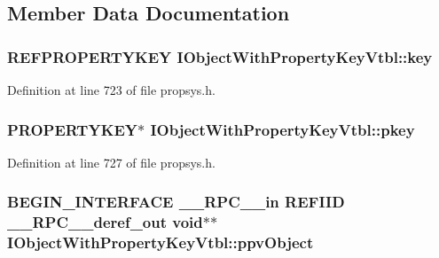 \subsection{Member Data Documentation}
\subsubsection[{\texorpdfstring{key}{key}}]{ {\bf R\+E\+F\+P\+R\+O\+P\+E\+R\+T\+Y\+K\+EY} I\+Object\+With\+Property\+Key\+Vtbl\+::key}\hypertarget{struct_i_object_with_property_key_vtbl_aea07e93e4789c7331bf474f6c5b452cf}{}\label{struct_i_object_with_property_key_vtbl_aea07e93e4789c7331bf474f6c5b452cf}


Definition at line 723 of file propsys.\+h.

\subsubsection[{\texorpdfstring{pkey}{pkey}}]{ {\bf P\+R\+O\+P\+E\+R\+T\+Y\+K\+EY}$\ast$ I\+Object\+With\+Property\+Key\+Vtbl\+::pkey}\hypertarget{struct_i_object_with_property_key_vtbl_a5aeba8bce0c15611f74a0299fca060d4}{}\label{struct_i_object_with_property_key_vtbl_a5aeba8bce0c15611f74a0299fca060d4}


Definition at line 727 of file propsys.\+h.

\subsubsection[{\texorpdfstring{ppv\+Object}{ppvObject}}]{\setlength{\rightskip}{0pt plus 5cm}B\+E\+G\+I\+N\+\_\+\+I\+N\+T\+E\+R\+F\+A\+CE {\bf \+\_\+\+\_\+\+R\+P\+C\+\_\+\+\_\+in} {\bf R\+E\+F\+I\+ID} {\bf \+\_\+\+\_\+\+R\+P\+C\+\_\+\+\_\+deref\+\_\+out} {\bf void}$\ast$$\ast$ I\+Object\+With\+Property\+Key\+Vtbl\+::ppv\+Object}\hypertarget{struct_i_object_with_property_key_vtbl_ac1a0db75684c7f6c7b9a18e7fabd6dc8}{}\label{struct_i_object_with_property_key_vtbl_ac1a0db75684c7f6c7b9a18e7fabd6dc8}


